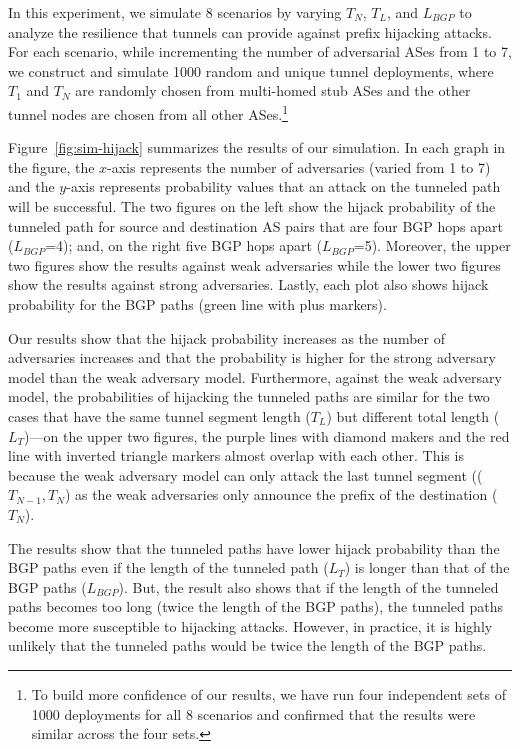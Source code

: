 In this experiment, we simulate 8 scenarios by varying $T_N$, $T_L$, and
$L_{BGP}$ to analyze the resilience that tunnels can provide against prefix
hijacking attacks. For each scenario, while incrementing the number of
adversarial ASes from 1 to 7, we construct and simulate 1000 random and unique
tunnel deployments, where $T_1$ and $T_N$ are randomly chosen from multi-homed
stub ASes and the other tunnel nodes are chosen from all other ASes.\footnote{
To build more confidence of our results, we have run four independent sets of
1000 deployments for all 8 scenarios and confirmed that the results were
similar across the four sets.}

Figure~\ref{fig:sim-hijack} summarizes the results of our simulation. In each
graph in the figure, the $x$-axis represents the number of adversaries (varied
from 1 to 7) and the $y$-axis represents probability values that an attack on
the tunneled path will be successful. The two figures on the left show the
hijack probability of the tunneled path for source and destination AS pairs
that are four BGP hops apart ($L_{BGP}$=4); and, on the right five BGP hops
apart ($L_{BGP}$=5). Moreover, the upper two figures show the results against
weak adversaries while the lower two figures show the results against strong
adversaries. Lastly, each plot also shows hijack probability for the BGP paths
(green line with plus markers).

Our results show that the hijack probability increases as the number of
adversaries increases and that the probability is higher for the strong
adversary model than the weak adversary model. Furthermore, against the weak
adversary model, the probabilities of hijacking the tunneled paths are similar
for the two cases that have the same tunnel segment length (\ie $T_L$) but
different total length (\ie $L_T$)---on the upper two figures, the purple lines
with diamond makers and the red line with inverted triangle markers almost
overlap with each other. This is because the weak adversary model can only
attack the last tunnel segment (\ie ($T_{N-1}, T_N$) as the weak adversaries
only announce the prefix of the destination (\ie $T_N$).

The results show that the tunneled paths have lower hijack probability than the
BGP paths even if the length of the tunneled path (\ie $L_T$) is longer than
that of the BGP paths (\ie $L_{BGP}$). But, the result also shows that if the
length of the tunneled paths becomes too long (\eg twice the length of the BGP
paths), the tunneled paths become more susceptible to hijacking attacks.
However, in practice, it is highly unlikely that the tunneled paths would be
twice the length of the BGP paths.

